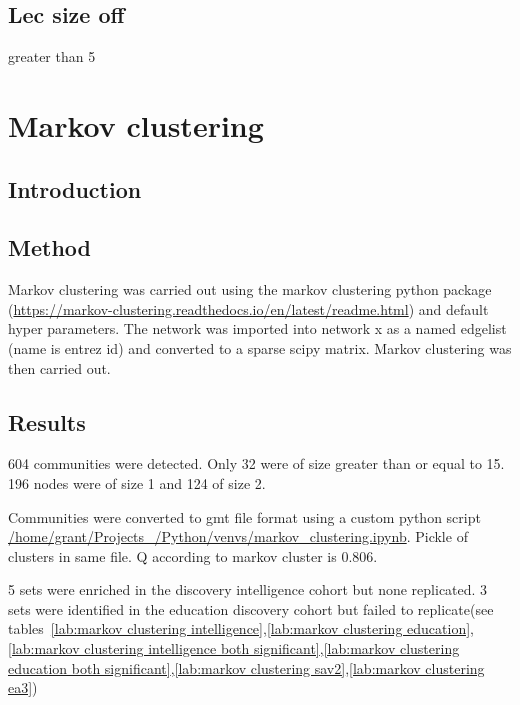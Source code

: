 \subsection{Lec size off}

greater than 5


\section{Markov clustering}

\subsection{Introduction}
\subsection{Method}
Markov clustering was carried out using the markov clustering python package (\url{https://markov-clustering.readthedocs.io/en/latest/readme.html}) and default hyper parameters. The network was imported into network x as a named edgelist (name is entrez id) and converted to a sparse scipy matrix. Markov clustering was then carried out.

\subsection{Results}

604 communities were detected. Only 32 were of size greater than or equal to 15.
196 nodes were of size 1 and 124 of size 2.

Communities were converted to gmt file format using a custom python script \url{/home/grant/Projects_/Python/venvs/markov_clustering.ipynb}. Pickle of clusters in same file. Q according to markov cluster is 0.806.

5 sets were enriched in the discovery intelligence cohort but none replicated. 3 sets were identified in the education discovery cohort but failed to replicate(see tables~\ref{lab:markov clustering intelligence},\ref{lab:markov clustering education},\ref{lab:markov clustering intelligence both significant},\ref{lab:markov clustering education both significant},\ref{lab:markov clustering sav2},\ref{lab:markov clustering ea3})

